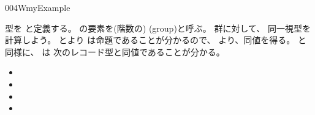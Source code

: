 \documentclass[index]{subfiles}
\begin{document}
\begin{myBlock}{004W}{myExample}
\begin{itemize}
  \end{itemize}
  型を
  と定義する。
  の要素を(階数の)
  (group)と呼ぶ。
  群に対して、
  同一視型を計算しよう。
  とより
  は命題であることが分かるので、
  より、同値を得る。
  と同様に、
  は
  次のレコード型と同値であることが分かる。
  \begin{itemize}
  \item {}
  \item {}
  \item {}
  \item {}
  \end{itemize}
\end{myBlock}
\end{document}
